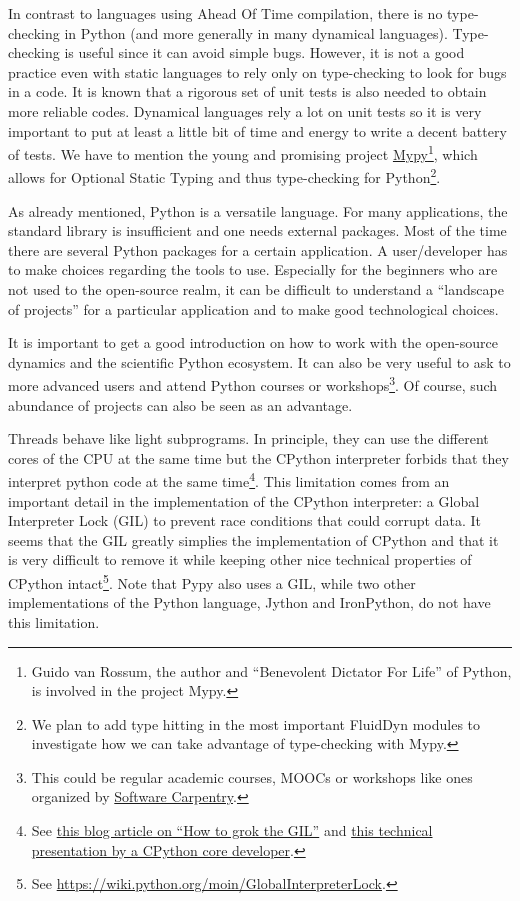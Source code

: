  In contrast to languages using Ahead Of Time
compilation, there is no type-checking in Python (and more generally in many
dynamical languages).  Type-checking is useful since it can avoid simple bugs.
However, it is not a good practice even with static languages to rely only on
type-checking to look for bugs in a code.
%
It is known that a rigorous set of unit tests is also needed to obtain more
reliable codes.
%
Dynamical languages rely a lot on unit tests so it is very important to put at
least a little bit of time and energy to write a decent battery of tests.
%
We have to mention the young and promising project
\href{http://mypy-lang.org/}{Mypy}\footnote{Guido van Rossum, the author and
``Benevolent Dictator For Life'' of Python, is involved in the project Mypy.},
which allows for Optional Static Typing and thus type-checking for
Python\footnote{We plan to add type hitting in the most important FluidDyn modules
to investigate how we can take advantage of type-checking with Mypy.}.

 As already
mentioned, Python is a versatile language. For many applications, the standard
library is insufficient and one needs external packages.
%
Most of the time there are several Python packages for a certain application.
A user/developer has to make choices regarding the tools to use.  Especially
for the beginners who are not used to the open-source realm, it can be
difficult to understand a ``landscape of projects'' for a particular
application and to make good technological choices.

It is important to get a good introduction on how to work with the open-source
dynamics and the scientific Python ecosystem.  It can also be very useful to ask
to more advanced users and attend Python courses or workshops\footnote{This could
be regular academic courses, MOOCs or workshops like ones organized by
\href{https://software-carpentry.org/}{Software Carpentry}.}.
%
Of course, such abundance of projects can also be seen as an advantage.

Threads behave like light subprograms. In principle, they can use the different
cores of the CPU at the same time but the CPython interpreter forbids that they
interpret python code at the same time\footnote{See
\href{https://opensource.com/article/17/4/grok-gil}{this blog article on ``How
to grok the GIL''} and
\href{https://faster-cpython.readthedocs.io/cpython37.html}{this technical
presentation by a CPython core developer}.}.
%
This limitation comes from an important detail in the implementation of the
CPython interpreter: a Global Interpreter Lock (GIL) to prevent race conditions
that could corrupt data.
%
It seems that the GIL greatly simplies the implementation of CPython and that it
is very difficult to remove it while keeping other nice technical properties of
CPython intact\footnote{See \url{https://wiki.python.org/moin/GlobalInterpreterLock}.}.
Note that Pypy also uses a GIL, while two other implementations of the Python
language, Jython and IronPython, do not have this limitation.

